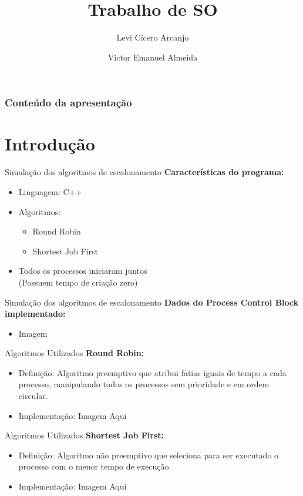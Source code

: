 \documentclass{beamer}
\author[Levi, Victor]{Levi Cícero Arcanjo  \and Victor Emanuel Almeida}
\title{Trabalho de SO}
\begin{document}
	\frame{\titlepage}
	\begin{frame}
		\frametitle{Conteúdo da apresentação}
		\tableofcontents
	\end{frame}
	\section{Introdução}
	
	
\begin{frame}{Simulação dos algoritmos de escalonamento}
    \textbf{Características do programa:}
	\begin{itemize}
	    \item Linguagem: C++
		\item Algoritmos: 
		    \begin{itemize}
		        \item Round Robin
		        \item Shortest Job First
		    \end{itemize}
		 \item Todos os processos iniciaram juntos \\ (Possuem tempo de criação zero)
	\end{itemize}
\end{frame}

\begin{frame}{Simulação dos algoritmos de escalonamento}
    \textbf{Dados do Process Control Block implementado:}
	\begin{itemize}
	    \item Imagem
	\end{itemize}
\end{frame}

\begin{frame}{Algoritmos Utilizados}
    \textbf{Round Robin:}
	\begin{itemize}
		\item Definição: Algoritmo preemptivo que atribui fatias iguais de tempo a cada processo, manipulando todos os processos sem prioridade e em ordem circular.
		\item Implementação: Imagem Aqui
	\end{itemize}
\end{frame}

\begin{frame}{Algoritmos Utilizados}
    \textbf{Shortest Job First:}
	\begin{itemize}
		\item Definição: Algoritmo não preemptivo que seleciona para ser executado o processo com o menor tempo de execução.
		\item Implementação: Imagem Aqui
	\end{itemize}
\end{frame}
\end{document}

